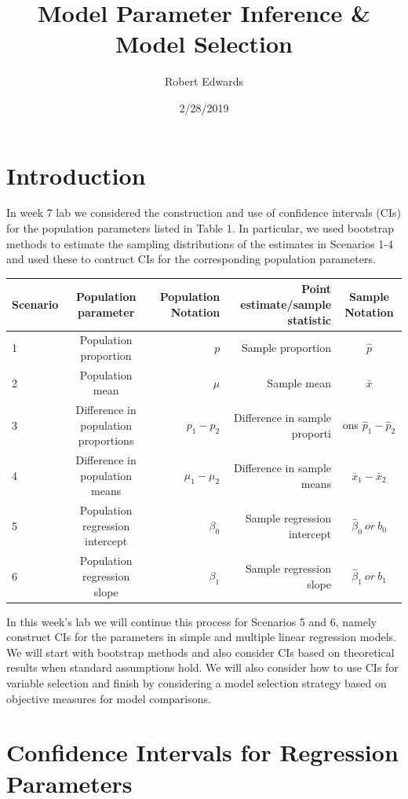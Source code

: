 \documentclass[]{article}
\title{Model Parameter Inference \& Model Selection}
\author{Robert Edwards}
\date{2/28/2019}
\begin{document}
\maketitle

\section{Introduction}\label{sec:Intro}

In week 7 lab we considered the construction and use of confidence
intervals (CIs) for the population parameters listed in Table 1. In
particular, we used bootstrap methods to estimate the sampling
distributions of the estimates in Scenarios 1-4 and used these to
contruct CIs for the corresponding population parameters.

\begin{longtable}[]{@{}lcrrc@{}}
\toprule
Scenario & Population parameter & Population Notation & Point
estimate/sample statistic & Sample Notation\tabularnewline
\midrule
\endhead
1 & Population proportion & \(p\) & Sample proportion &
\(\hat{p}\)\tabularnewline
2 & Population mean & \(\mu\) & Sample mean & \(\bar{x}\)\tabularnewline
3 & Difference in population proportions & \(p_1-p_2\) & Difference in
sample proporti & ons \(\hat{p}_1-\hat{p}_2\)\tabularnewline
4 & Difference in population means & \(\mu_1-\mu_2\) & Difference in
sample means & \(\bar{x}_1-\bar{x}_2\)\tabularnewline
5 & Population regression intercept & \(\beta_0\) & Sample regression
intercept & \(\hat{\beta}_0~or~b_0\)\tabularnewline
6 & Population regression slope & \(\beta_1\) & Sample regression slope
& \(\hat{\beta}_1~or~b_1\)\tabularnewline
\bottomrule
\end{longtable}

In this week's lab we will continue this process for Scenarios 5 and 6,
namely construct CIs for the parameters in simple and multiple linear
regression models. We will start with bootstrap methods and also
consider CIs based on theoretical results when standard assumptions
hold. We will also consider how to use CIs for variable selection and
finish by considering a model selection strategy based on objective
measures for model comparisons.

\newpage

\section{Confidence Intervals for Regression
Parameters}\label{sec:regression}
\end{document}

